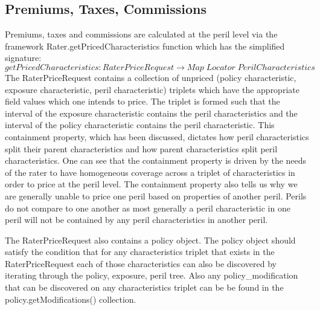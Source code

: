 \documentclass[a4paper,11pt]{article}
\begin{document}
\subsection{Premiums, Taxes, Commissions}
Premiums, taxes and commissions are calculated at the peril level via the framework Rater.getPricedCharacteristics function
which has the simplified signature:
\begin{equation*}
  getPricedCharacteristics: RaterPriceRequest \to Map \; Locator \; PerilCharacteristics
\end{equation*}
The RaterPriceRequest contains a collection of unpriced (policy characteristic, exposure characteristic, peril characteristic) triplets
which have the appropriate field values which one intends to price. The triplet is formed such that the interval of the
exposure characteristic contains the peril characteristics and the interval of the policy characteristic contains the
peril characteristic. This containment property, which has been discussed, dictates how peril characteristics split
their parent characteristics and how parent characteristics split peril characteristics. One can see that the containment property
is driven by the needs of the rater to have homogeneous coverage across a triplet of characteristics in order to price at the peril
level. The containment property also tells us why we are generally unable to price one peril based on properties of another peril.
Perils do not compare to one another as most generally a peril characteristic in one peril will not be contained by any
peril characteristics in another peril.

The RaterPriceRequest also contains a policy object. The policy object should satisfy the condition that for any
characteristics triplet that exists in the RaterPriceRequest each of those characteristics can also be discovered by
iterating through the policy, exposure, peril tree. Also any policy\_modification that can be discovered on any
characteristics triplet can be be found in the policy.getModifications() collection.
\end{document}
